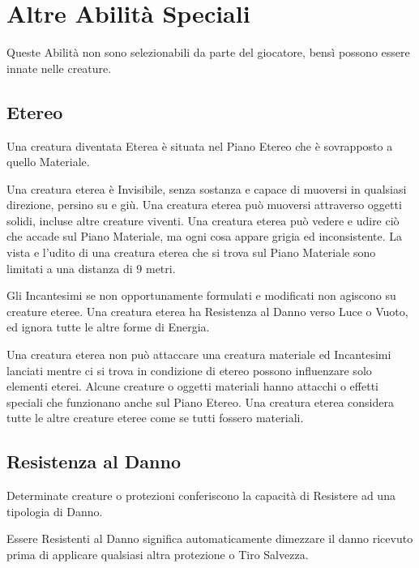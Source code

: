 \section{Altre Abilità Speciali}

\begin{multicols}{2}

Queste Abilità non sono selezionabili da parte del giocatore, bensì possono essere innate nelle creature.

\subsection{Etereo}\label{etereo}

Una creatura diventata Eterea è situata nel Piano Etereo che è sovrapposto a quello Materiale.

Una creatura eterea è Invisibile, senza sostanza e capace di muoversi in qualsiasi direzione, persino su e giù. Una creatura eterea può muoversi attraverso oggetti solidi, incluse altre creature viventi. Una creatura eterea può vedere e udire ciò che accade sul Piano Materiale, ma ogni cosa appare grigia ed inconsistente. La vista e l'udito di una creatura eterea che si trova sul Piano Materiale sono limitati a una distanza di 9 metri.

Gli Incantesimi se non opportunamente formulati e modificati non agiscono su creature eteree. Una creatura eterea ha Resistenza al Danno verso Luce o Vuoto, ed ignora tutte le altre forme di Energia.

Una creatura eterea non può attaccare una creatura materiale ed Incantesimi lanciati mentre ci si trova in condizione di etereo possono influenzare solo elementi eterei. Alcune creature o oggetti materiali hanno attacchi o effetti speciali che funzionano anche sul Piano Etereo. Una creatura eterea considera tutte le altre creature eteree come se tutti fossero materiali.

\subsection{Resistenza al Danno}\label{resistenzaaldanno}

Determinate creature o protezioni conferiscono la capacità di Resistere ad una tipologia di Danno.

Essere Resistenti al Danno significa automaticamente dimezzare il danno ricevuto prima di applicare qualsiasi altra protezione o Tiro Salvezza.


\end{multicols}
